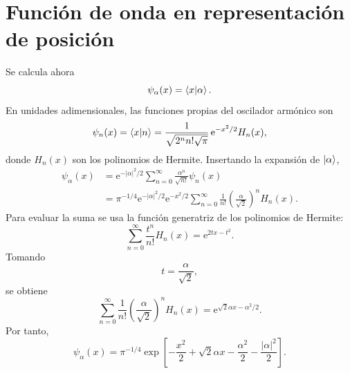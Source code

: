 \documentclass[11pt]{article}
\newcommand{\ee}{\mathrm{e}}
\begin{document}
\section{Funci\'on de onda en representaci\'on de posici\'on}

Se calcula ahora
\begin{equation}
  \psi_\alpha(x)=\braket{x|\alpha}.
\end{equation}
En unidades adimensionales, las funciones propias del oscilador arm\'onico son
\begin{equation}
  \psi_n(x)=\braket{x|n}
  =
  \frac{1}{\sqrt{2^n n!\sqrt\pi}}\,
  \ee^{-x^2/2}H_n(x),
\end{equation}
donde $H_n(x)$ son los polinomios de Hermite. Insertando la expansi\'on de
$\ket{\alpha}$,
\begin{align}
  \psi_\alpha(x)
  &=\ee^{-|\alpha|^2/2}
    \sum_{n=0}^{\infty}
    \frac{\alpha^n}{\sqrt{n!}}\psi_n(x)\\
  &=
    \pi^{-1/4}\ee^{-|\alpha|^2/2}\ee^{-x^2/2}
    \sum_{n=0}^{\infty}
    \frac{1}{n!}
    \left(\frac{\alpha}{\sqrt2}\right)^nH_n(x).
\end{align}
Para evaluar la suma se usa la funci\'on generatriz de los polinomios de
Hermite:
\begin{equation}
  \sum_{n=0}^{\infty}\frac{t^n}{n!}H_n(x)
  =\ee^{2tx-t^2}.
\end{equation}
Tomando
\begin{equation}
  t=\frac{\alpha}{\sqrt2},
\end{equation}
se obtiene
\begin{equation}
  \sum_{n=0}^{\infty}
  \frac{1}{n!}
  \left(\frac{\alpha}{\sqrt2}\right)^nH_n(x)
  =
  \ee^{\sqrt2\alpha x-\alpha^2/2}.
\end{equation}
Por tanto,
\begin{equation}
  \psi_\alpha(x)
  =
  \pi^{-1/4}
  \exp\left[
  -\frac{x^2}{2}
  +\sqrt2\alpha x
  -\frac{\alpha^2}{2}
  -\frac{|\alpha|^2}{2}
  \right].
\end{equation}
\end{document}
